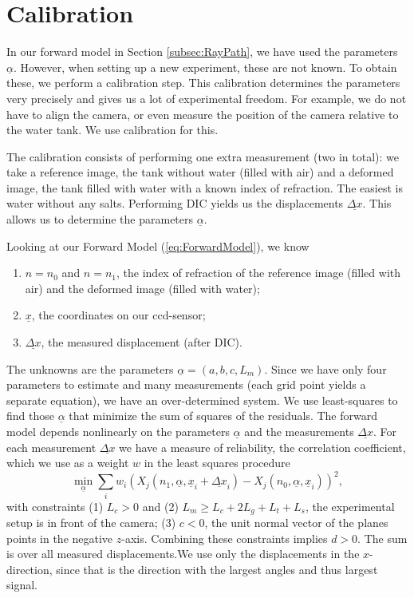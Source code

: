 \documentclass[draft]{svjour3}                     %
\begin{document}
\section{Calibration}
\label{sec:cal}
In our forward model in Section \ref{subsec:RayPath}, we have used the parameters $\underline{\alpha}$. However, when setting up a new experiment, these are not known. To obtain these, we perform a calibration step. This calibration determines the parameters very precisely and gives us a lot of experimental freedom. For example, we do not have to align the camera, or even measure the position of the camera relative to the water tank. We use calibration for this.

The calibration consists of performing one extra measurement (two in total): we take a reference image, the tank without water (filled with air) and a deformed image, the tank filled with water with a known index of refraction. The easiest is water without any salts. Performing DIC yields us the displacements $\underline{\Delta x}$. This allows us to determine the parameters $\underline{\alpha}.$

Looking at our Forward Model (\ref{eq:ForwardModel}), we know
\begin{enumerate}
	\item $n=n_0$ and $n=n_1$, the index of refraction of the reference image (filled with air) and the deformed image (filled with water); 
	\item $\underline{x}$, the coordinates on our ccd-sensor; 
	\item $\underline{\Delta x}$, the measured displacement (after DIC). 
\end{enumerate}
The unknowns are the parameters $\underline{\alpha} = (a, b, c, L_m)$. Since we have only four parameters to estimate and many measurements (each grid point yields a separate equation), we have an over-determined system. We use least-squares to find those $\underline{\alpha}$ that minimize the sum of squares of the residuals. The forward model depends nonlinearly on the parameters $\underline{\alpha}$ and the measurements $\underline{\Delta x}$. For each measurement $\underline{\Delta x}$ we have a measure of reliability, the correlation coefficient, which we use as a weight $w$ in the least squares procedure
\begin{equation}
\label{eq:calmin} 
	 \min_{\underline{\alpha}} \sum_i w_i \left(X_{j}(n_1, \underline{\alpha}, \underline{x}_i+\underline{\Delta x}_i) - X_{j}(n_0, \underline{\alpha}, \underline{x}_i)\right)^2, 
\end{equation}
with constraints (1) $L_c > 0$ and (2) $L_m \geq L_c + 2 L_g + L_t + L_s$, the experimental setup is in front of the camera; (3) $c < 0$, the unit normal vector of the planes points in the negative $z$-axis. Combining these constraints implies $d>0$. The sum is over all measured displacements.We use only the displacements in the $x$-direction, since that is the direction with the largest angles and thus largest signal. %
\end{document}
